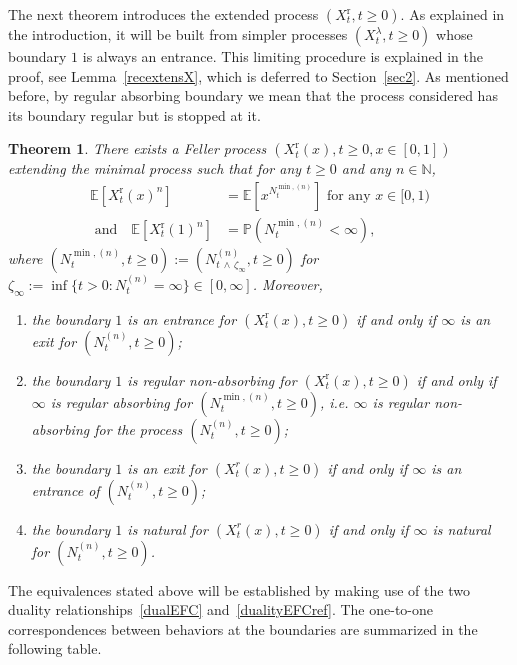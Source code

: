 \documentclass[10pt]{amsart}
\newtheorem{theo}{Theorem}[section]
\theoremstyle{definition}\newtheorem{defi}[theo]{Definition}\newtheorem{rema}[theo]{Remark}\newtheorem{exam}[theo]{Example}\newtheorem{exem}[theo]{Example}\newtheorem{nota}[theo]{Notation}
\newcommand{\rmr}{\mathrm{r}}
\newcommand{\bbN}{\mathbb{N}}
\newcommand{\bbE}{\mathbb{E}}
\newcommand{\bbP}{\mathbb{P}}
\newcommand*{\romanenumi}{\renewcommand*{\theenumi}{\roman{enumi}}}
\begin{document}
The next theorem introduces the extended process $(X_t^{\rmr},t\geq 0)$. As explained in the introduction, it will be built from simpler processes $(X_t^{\lambda},t\geq 0)$ whose boundary $1$ is always an entrance. This limiting procedure is explained in the proof, see Lemma~\ref{recextensX}, which is deferred to Section~\ref{sec2}. As mentioned before, by regular absorbing boundary we mean that the process considered has its boundary regular but is stopped at it.

\begin{theo}\label{thmmomentduality2}
There exists a Feller process $(X_t^{\rmr}(x),t\geq 0, x\in [0,1])$ extending the minimal process such that for any $t\geq 0$ and any $n\in \bbN$,
\begin{equation}\label{dualityEFCref}
\begin{split}
\bbE\left[X^{\rmr}_t(x)^n\right] &=\bbE\left[x^{N^{\min,(n)}_t}\right] \text{ for any } x\in [0,1) \\
\text{ and}\quad \bbE\left[X^{\rmr}_t(1)^n\right] &=\bbP\left(N^{\min,(n)}_t<\infty\right),
\end{split}
\end{equation}
where $(N^{\min,(n)}_t,t\geq 0):=(N_{t\,\wedge\, \zeta_{\infty}}^{(n)},t\geq 0)$ for $\zeta_{\infty}:=\inf\{t>0: N_t^{(n)}=\infty\}\in [0,\infty]$. Moreover,
\begin{enumerate}\romanenumi
\item\label{theo2.7.i} the boundary $1$ is an entrance for $(X^{\rmr}_t(x),t\geq 0)$ if and only if $\infty$ is an exit for $(N^{(n)}_t,t\geq 0)$;
\item\label{theo2.7.ii} the boundary $1$ is regular non-absorbing for $(X^{\rmr}_t(x),t\geq 0)$ if and only if $\infty$ is regular absorbing for $(N^{\min,(n)}_t,t\geq 0)$, i.e. $\infty$ is regular non-absorbing for the process $(N^{(n)}_t,t\geq 0)$;
\item\label{theo2.7.iii} the boundary $1$ is an exit for $(X^{r}_t(x),t\geq 0)$ if and only if $\infty$ is an entrance of $(N^{(n)}_t,t\geq 0)$;
\item\label{theo2.7.iv} the boundary $1$ is natural for $(X^{r}_t(x),t\geq 0)$ if and only if $\infty$ is natural for $(N^{(n)}_t,t\geq 0)$.
\end{enumerate}
\end{theo}

The equivalences stated above will be established by making use of the two duality relationships~\eqref{dualEFC} and~\eqref{dualityEFCref}. The one-to-one correspondences between behaviors at the boundaries are summarized in the following table.
\end{document}
